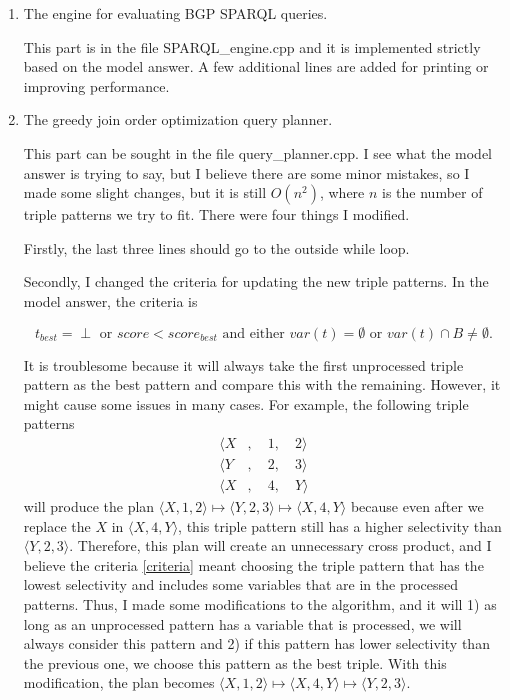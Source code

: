 \documentclass{article}
\begin{document}
\begin{enumerate}
\begin{enumerate}
\item The engine for evaluating BGP SPARQL queries.

This part is in the file SPARQL\_engine.cpp and it is implemented strictly based on the model answer. A few additional lines are added for printing or improving performance.

\item The greedy join order optimization query planner.

This part can be sought in the file query\_planner.cpp. I see what the model answer is trying to say, but I believe there are some minor mistakes, so I made some slight changes, but it is still $O(n^2)$, where $n$ is the number of triple patterns we try to fit. There were four things I modified. 

Firstly, the last three lines should go to the outside while loop. 


Secondly, I changed the criteria for updating the new triple patterns. In the model answer, the criteria is 

\begin{equation}\label{criteria}
	t_{best} = \perp \text{ or } score < score_{best} \text{ and either } var(t) = \emptyset \text{ or } var(t) \cap B \neq \emptyset.
\end{equation}

It is troublesome because it will always take the first unprocessed triple pattern as the best pattern and compare this with the remaining. However, it might cause some issues in many cases. For example, the following triple patterns 
\begin{align*}
	\langle X &,\quad 1,\quad 2\rangle \\
	\langle Y &,\quad 2,\quad 3\rangle\\
	\langle X &,\quad 4,\quad Y\rangle
\end{align*}
will produce the plan $\langle X, 1, 2\rangle \mapsto \langle Y, 2, 3\rangle \mapsto \langle X, 4, Y\rangle$ because even after we replace the $X$ in $\langle X, 4, Y\rangle$, this triple pattern still has a higher selectivity than $\langle Y, 2, 3\rangle$. Therefore, this plan will create an unnecessary cross product, and I believe the criteria \eqref{criteria} meant choosing the triple pattern that has the lowest selectivity and includes some variables that are in the processed patterns. Thus, I made some modifications to the algorithm, and it will 1) as long as an unprocessed pattern has a variable that is processed, we will always consider this pattern and 2) if this pattern has lower selectivity than the previous one, we choose this pattern as the best triple. With this modification, the plan becomes $\langle X, 1, 2\rangle \mapsto \langle X, 4, Y\rangle \mapsto \langle Y, 2, 3\rangle$. 


\end{enumerate}
\end{enumerate}
\end{document}
